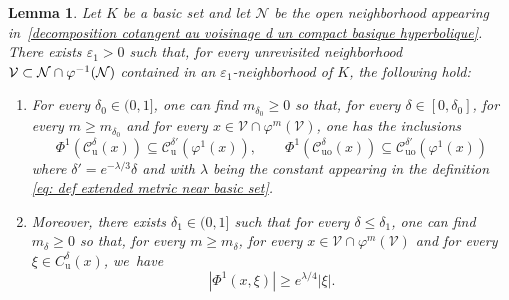 \documentclass[11pt]{article}
\newenvironment{enumeratei}
{\bgroup\def\theenumi{\roman{enumi}}\def\theenumii{\arabic{enumii}}\begin{enumerate}}
{\end{enumerate}\egroup}
\newcommand{\ru}{\mathrm{u}}
\newcommand{\ruo}{\mathrm{uo}}
\theoremstyle{definition}
\theoremstyle{plain}
\newtheorem{lemma}[definition]{Lemma}
\newcommand{\Ccal}{\mathcal{C}}
\newcommand{\Ncal}{\mathcal{N}}
\newcommand{\Vcal}{\mathcal{V}}
\begin{document}
\begin{lemma}\label{stabilite voisinage conique tilde pour Phi1} Let $K$ be a basic set and let $\Ncal$ be the open neighborhood appearing in~\eqref{decomposition cotangent au voisinage d un compact basique hyperbolique}. There exists $\varepsilon_1 >0$ such that, for every unrevisited neighborhood $\Vcal \subset \Ncal \cap\nobreak\varphi^{-1}(\Ncal)$ contained in an $\varepsilon_1$-neighborhood of $K$, the following hold:
\begin{enumeratei}
\item\label{stabilitei} For every $\delta_0\in(0,1]$, one can find $m_{\delta_0} \geq 0$ so that, for every $\delta\in[0,\delta_0]$, for every $m \geq m_{\delta_0}$ and for every $x\in\mathcal{V}\cap\varphi^{m}(\Vcal)$,
one has the inclusions
\begin{equation}\label{lemma stab vois conique tilde - Unstable inlusions}
\Phi^{1}\left(\Ccal_{\ru}^{\delta}(x)\right) \subseteq \Ccal_{\ru}^{\delta'}(\varphi^{1}(x)), \qquad
\Phi^{1}\left(\Ccal_{\ruo}^{\delta}(x) \right) \subseteq \Ccal_{\ruo}^{\delta'}(\varphi^{1}(x))
\end{equation}
where $\delta' = e^{-\lambda/3} \delta$ and with $\lambda$ being the constant appearing in the definition \eqref{eq: def extended metric near basic set}.
\item\label{stabiliteii} Moreover, there exists $\delta_1\in(0,1]$ such that for every $\delta \leq \delta_1$, one can find $m_{\delta} \geq 0$ so that, for every $m \geq m_\delta$, for every $x \in \Vcal \cap\varphi^{m}(\Vcal)$ and for every $\xi \in C^\delta_\ru(x)$, we~have
\[
|\Phi^1 (x,\xi)| \geq e^{\lambda /4} |\xi|.
\]
\end{enumeratei}
\end{lemma}
\end{document}
